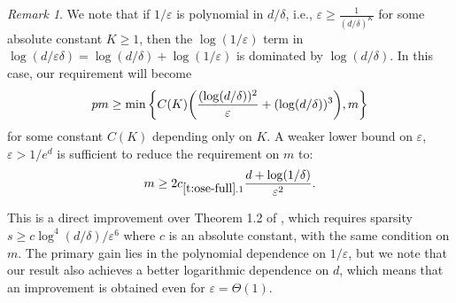 \documentclass[11pt]{amsart}
\numberwithin{equation}{section}
\numberwithin{equation}{section}
\DeclarePairedDelimiter{\paren}{(}{)}
\theoremstyle{remark}
\newtheorem{remark}[theorem]{Remark}
\theoremstyle{definition}
\begin{document}
\begin{remark}
We note that if $1/\varepsilon$ is polynomial in $d/\delta$, i.e., $\varepsilon \ge \frac{1}{(d/\delta)^K}$ for some absolute constant $K\geq 1$, then the $\log(1/\varepsilon)$ term in $\log(d/\varepsilon\delta) = \log(d/\delta) + \log(1/\varepsilon)$ is dominated by $\log(d/\delta)$. In this case, our requirement will become
\begin{align*}pm \ge \min \left\{C(K) \paren*{\frac{(\log (d/\delta))^2}{\varepsilon}+(\log (d/\delta))^3},m \right\}
\end{align*}
for some constant $C(K)$ depending only on $K$.
A weaker lower bound on $\varepsilon$, $\varepsilon > 1/e^d$ is sufficient to reduce the requirement on $m$ to:
\[ m \ge 2c_{\ref*{t:ose-full}.1}  \frac{d + \log(1/\delta)}{\varepsilon^2}.   \]

\end{remark}


This is a direct improvement over Theorem 1.2 of  \cite{chenakkod2024optimal}, which requires sparsity $s\geq c\log^4(d/\delta)/\varepsilon^6$ where $c$ is an absolute constant, with the same condition on $m$. The primary gain lies in the polynomial dependence on $1/\varepsilon$, but we note that our result also achieves a better logarithmic dependence on $d$, which means that an improvement is obtained even for $\varepsilon=\Theta(1)$.
\end{document}
